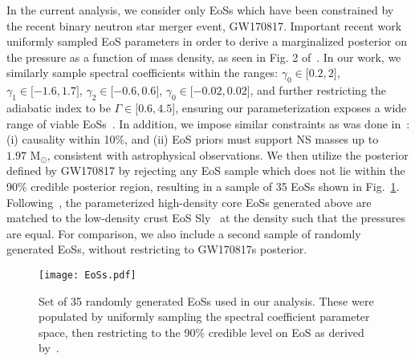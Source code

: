 \documentclass[prd,twocolumn,nofootinbib,superscriptaddress,amsmath,amssymb]{revtex4-1}
\begin{document}
In the current analysis, we consider only EoSs which have been constrained by the recent binary neutron star merger event, GW170817.
Important recent work~\cite{LIGO:posterior} uniformly sampled EoS parameters in order to derive a marginalized posterior on the pressure as a function of mass density, as seen in Fig. 2 of~\cite{LIGO:posterior}.
In our work, we similarly sample spectral coefficients within the ranges: $\gamma_0 \in \lbrack 0.2,2 \rbrack$, $\gamma_1 \in \lbrack -1.6,1.7 \rbrack$, $\gamma_2 \in \lbrack -0.6,0.6 \rbrack$, $\gamma_0 \in \lbrack -0.02,0.02 \rbrack$, and further restricting the adiabatic index to be $\Gamma \in \lbrack 0.6,4.5 \rbrack$, ensuring our parameterization exposes a wide range of viable EoSs~\cite{Lindblom:parameters}.
In addition, we impose similar constraints as was done in~\cite{LIGO:posterior}: (i) causality within 10\%, and (ii) EoS priors must support NS masses up to $1.97 \text{ M}_{\odot}$, consistent with astrophysical observations.
We then utilize the posterior defined by GW170817 by rejecting any EoS sample which does not lie within the 90\% credible posterior region, resulting in a sample of 35 EoSs shown in Fig.~\ref{fig:eos}.
Following~\cite{Read2009}, the parameterized high-density core EoSs generated above are matched to the low-density crust EoS Sly~\cite{Douchin:2001sv} at the density such that the pressures are equal.
For comparison, we also include a second sample of randomly generated EoSs, without restricting to GW170817s posterior.
\begin{figure}
\begin{center} 
\texttt{[image: EoSs.pdf]}
\end{center}
\caption{
Set of 35 randomly generated EoSs used in our analysis. 
These were populated by uniformly sampling the spectral coefficient parameter space, then restricting to the 90\% credible level on EoS as derived by~\cite{LIGO:posterior}.
}
\label{fig:eos}
\end{figure} 
\end{document}
